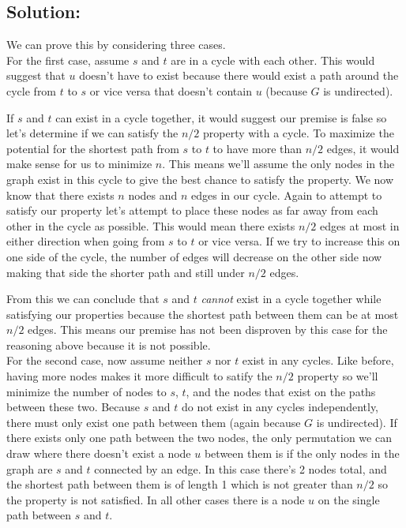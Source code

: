 \documentclass[12pt]{article}
\begin{document}
\subsection*{\textbf{Solution:}}
We can prove this by considering three cases. \\

For the first case, assume $s$ and $t$ are in a cycle with each other. This would suggest that $u$ doesn't have to exist because there would exist a path around the cycle from $t$ to $s$ or vice versa that doesn't contain $u$ (because $G$ is undirected). 

If $s$ and $t$ can exist in a cycle together, it would suggest our premise is false so let's determine if we can satisfy the $n/2$ property with a cycle. To maximize the potential for the shortest path from $s$ to $t$ to have more than $n/2$ edges, it would make sense for us to minimize $n$. This means we'll assume the only nodes in the graph exist in this cycle to give the best chance to satisfy the property. We now know that there exists $n$ nodes and $n$ edges in our cycle. Again to attempt to satisfy our property let's attempt to place these nodes as far away from each other in the cycle as possible. This would mean there exists $n/2$ edges at most in either direction when going from $s$ to $t$ or vice versa. If we try to increase this on one side of the cycle, the number of edges will decrease on the other side now making that side the shorter path and still under $n/2$ edges.

From this we can conclude that $s$ and $t$ \textit{cannot} exist in a cycle together while satisfying our properties because the shortest path between them can be at most $n/2$ edges. This means our premise has not been disproven by this case for the reasoning above because it is not possible.\\

For the second case, now assume neither $s$ nor $t$ exist in any cycles. Like before, having more nodes makes it more difficult to satify the $n/2$ property so we'll minimize the number of nodes to $s$, $t$, and the nodes that exist on the paths between these two. Because $s$ and $t$ do not exist in any cycles independently, there must only exist one path between them (again because $G$ is undirected). If there exists only one path between the two nodes, the only permutation we can draw where there doesn't exist a node $u$ between them is if the only nodes in the graph are $s$ and $t$ connected by an edge. In this case there's 2 nodes total, and the shortest path between them is of length 1 which is not greater than $n/2$ so the property is not satisfied. In all other cases there is a node $u$ on the single path between $s$ and $t$.
\end{document}
